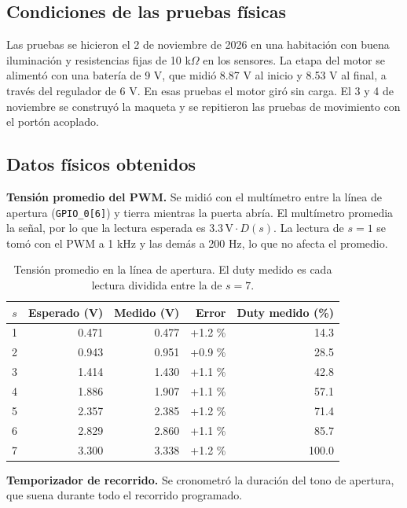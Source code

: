 \documentclass[12pt,letterpaper]{article}
\begin{document}
\subsection{Condiciones de las pruebas físicas}

Las pruebas se hicieron el 2 de noviembre de 2026 en una
habitación con buena iluminación y resistencias fijas de
10 k$\Omega$ en los sensores. La etapa del motor se
alimentó con una batería de 9 V, que midió 8.87 V al
inicio y 8.53 V al final, a través del regulador de 6 V.
En esas pruebas el motor giró sin carga. El 3 y 4 de
noviembre se construyó la maqueta y se repitieron las
pruebas de movimiento con el portón acoplado.

\subsection{Datos físicos obtenidos}

\textbf{Tensión promedio del PWM.} Se midió con el
multímetro entre la línea de apertura
(\texttt{GPIO\_0[6]}) y tierra mientras la puerta abría. El multímetro
promedia la señal, por lo que la lectura esperada es
$3.3\,\mathrm{V}\cdot D(s)$. La lectura de $s=1$ se tomó
con el PWM a 1 kHz y las demás a 200 Hz, lo que no afecta
el promedio.

\begin{table}[H]
\centering
\begin{tabular}{@{}crrrr@{}}
\toprule
$s$ & Esperado (V) & Medido (V) & Error & Duty medido (\%)\\
\midrule
1 & 0.471 & 0.477 & +1.2 \% & 14.3\\
2 & 0.943 & 0.951 & +0.9 \% & 28.5\\
3 & 1.414 & 1.430 & +1.1 \% & 42.8\\
4 & 1.886 & 1.907 & +1.1 \% & 57.1\\
5 & 2.357 & 2.385 & +1.2 \% & 71.4\\
6 & 2.829 & 2.860 & +1.1 \% & 85.7\\
7 & 3.300 & 3.338 & +1.2 \% & 100.0\\
\bottomrule
\end{tabular}
\caption{Tensión promedio en la línea de apertura. El duty
medido es cada lectura dividida entre la de $s=7$.}
\label{tab:pwm_fisico}
\end{table}

\textbf{Temporizador de recorrido.} Se cronometró la
duración del tono de apertura, que suena durante todo el
recorrido programado.
\end{document}
